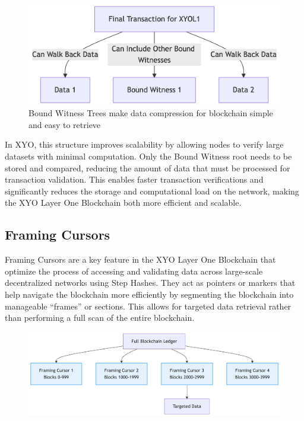 \documentclass{article}
\begin{document}
\begin{figure}[ht]
    \centering
    \includegraphics[width=15cm]{bound-witness-trees.png}
    \caption{Bound Witness Trees make data compression for blockchain simple and easy to retrieve}
\end{figure}

In XYO, this structure improves scalability by allowing nodes to verify large
datasets with minimal computation. Only the Bound Witness root needs to be
stored and compared, reducing the amount of data that must be processed for
transaction validation. This enables faster transaction verifications and
significantly reduces the storage and computational load on the network, making
the XYO Layer One Blockchain both more efficient and scalable.

\subsection{Framing Cursors}
Framing Cursors are a key feature in the XYO Layer One Blockchain that optimize
the process of accessing and validating data across large-scale decentralized
networks using Step Hashes. They act as pointers or markers that help navigate
the blockchain more efficiently by segmenting the blockchain into manageable
“frames” or sections. This allows for targeted data retrieval rather than
performing a full scan of the entire blockchain.

\begin{figure}[h]
    \centering
    \includegraphics[width=15cm]{framing-cursor.png}
\end{figure}
\end{document}
